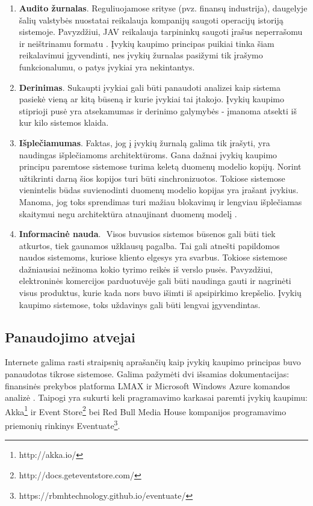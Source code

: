 \begin{enumerate}

  \item \textbf{Audito žurnalas}. Reguliuojamose srityse (pvz. finansų industrija), daugelyje šalių valstybės nuostatai reikalauja kompanijų saugoti operacijų istoriją sistemoje. Pavyzdžiui, JAV reikalauja tarpininkų saugoti įrašus neperrašomu ir neištrinamu formatu \cite{US:StorageRules}. Įvykių kaupimo principas puikiai tinka šiam reikalavimui įgyvendinti, nes įvykių žurnalas pasižymi tik įrašymo funkcionalumu, o patys įvykiai yra nekintantys.

  \item \textbf{Derinimas}. Sukaupti įvykiai gali būti panaudoti analizei kaip sistema pasiekė vieną ar kitą būseną ir kurie įvykiai tai įtakojo. Įvykių kaupimo stiprioji pusė yra atsekamumas ir derinimo galymybės - įmanoma atsekti iš kur kilo sistemos klaida.

  \item \textbf{Išplečiamumas}. Faktas, jog į įvykių žurnalą galima tik įrašyti, yra naudingas išplečiamoms architektūroms. Gana dažnai įvykių kaupimo principu paremtose sistemose turima keletą duomenų modelio kopijų. Norint užtikrinti darną šios kopijos turi būti sinchronizuotos. Tokiose sistemose vienintelis būdas suvienodinti duomenų modelio kopijas yra įrašant įvykius. Manoma, jog toks sprendimas turi mažiau blokavimų ir lengviau išplečiamas skaitymui negu architektūra atnaujinant duomenų modelį \cite{GetEventStore:Basics}.

  \item \textbf{Informacinė nauda}.  Visos buvusios sistemos būsenos gali būti tiek atkurtos, tiek gaunamos užklausų pagalba. Tai gali atnešti papildomos naudos sistemoms, kuriose kliento elgesys yra svarbus. Tokiose sistemose dažniausiai nežinoma kokio tyrimo reikės iš verslo pusės. Pavyzdžiui, elektroninės komercijos parduotuvėje gali būti naudinga gauti ir nagrinėti visus produktus, kurie kada nors buvo išimti iš apsipirkimo krepšelio. Įvykių kaupimo sistemose, toks uždavinys gali būti lengvai įgyvendintas.

\end{enumerate}

\subsection{Panaudojimo atvejai}

Internete galima rasti straipsnių aprašančių kaip įvykių kaupimo principas buvo panaudotas tikrose sistemose. Galima pažymėti dvi išsamias dokumentacijas: finansinės prekybos platforma LMAX \cite{Fowler:LMAX} ir Microsoft Windows Azure komandos analizė \cite{Betts:2013:ECE:2509680}. Taipogi yra sukurti keli pragramavimo karkasai paremti įvykių kaupimu: Akka\footnote{http://akka.io/} ir Event Store\footnote{http://docs.geteventstore.com/} bei Red Bull Media House kompanijos programavimo priemonių rinkinys Eventuate\footnote{https://rbmhtechnology.github.io/eventuate/}.

